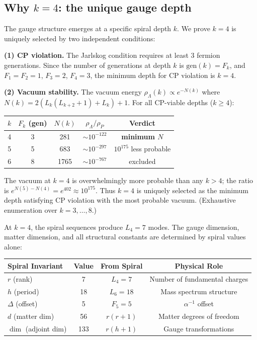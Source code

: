 \documentclass[12pt,a4paper]{article}
\begin{document}
\subsection{Why $k = 4$: the unique gauge depth}
\label{sec:k4-uniqueness}

The gauge structure emerges at a specific spiral depth $k$. We prove $k = 4$ is uniquely selected by two independent conditions:

\textbf{(1) CP violation.} The Jarlskog condition requires at least 3 fermion generations. Since the number of generations at depth $k$ is $\mathrm{gen}(k) = F_k$, and $F_1 = F_2 = 1$, $F_3 = 2$, $F_4 = 3$, the minimum depth for CP violation is $k = 4$.

\textbf{(2) Vacuum stability.} The vacuum energy $\rho_{\Lambda}(k) \propto e^{-N(k)}$ where $N(k) = 2(L_k(L_{k+2}+1) + L_k) + 1$. For all CP-viable depths ($k \geq 4$):
\begin{center}
\begin{tabular}{c|c|c|c|c}
$k$ & $F_k$ (gen) & $N(k)$ & $\rho_{\Lambda}/\rho_P$ & Verdict \\
\hline
4 & 3 & 281 & $\sim 10^{-122}$ & \textbf{minimum $N$} \\
5 & 5 & 683 & $\sim 10^{-297}$ & $10^{175}$ less probable \\
6 & 8 & 1765 & $\sim 10^{-767}$ & excluded \\
\end{tabular}
\end{center}
The vacuum at $k = 4$ is overwhelmingly more probable than any $k > 4$; the ratio is $e^{N(5)-N(4)} = e^{402} \approx 10^{175}$. Thus $k = 4$ is uniquely selected as the minimum depth satisfying CP violation with the most probable vacuum. (Exhaustive enumeration over $k = 3, \ldots, 8$.)

At $k = 4$, the spiral sequences produce $L_4 = 7$ modes. The gauge dimension, matter dimension, and all structural constants are determined by spiral values alone:

\begin{center}
\begin{tabular}{|l|c|c|c|}
\hline
\textbf{Spiral Invariant} & \textbf{Value} & \textbf{From Spiral} & \textbf{Physical Role} \\
\hline
$r$ (rank) & 7 & $L_4 = 7$ & Number of fundamental charges \\
$h$ (period) & 18 & $L_6 = 18$ & Mass spectrum structure \\
$\Delta$ (offset) & 5 & $F_5 = 5$ & $\alpha^{-1}$ offset \\
$d$ (matter dim) & 56 & $r(r+1)$ & Matter degrees of freedom \\
$\dim$ (adjoint dim) & 133 & $r(h+1)$ & Gauge transformations \\
\hline
\end{tabular}
\end{center}
\end{document}
